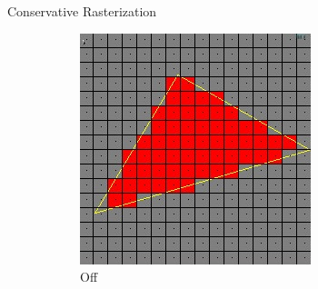 \documentclass[10pt]{beamer}
\begin{document}
\begin{frame}{Conservative Rasterization}

  \begin{figure}
    \begin{subfigure}[t]{0.4\textwidth}
      \includegraphics[width=\textwidth]{conservativeraster_off}
      \caption*{Off}
    \end{subfigure}
    ~
    \begin{subfigure}[t]{0.4\textwidth}

\end{subfigure}
\end{figure}
\end{frame}
\end{document}
